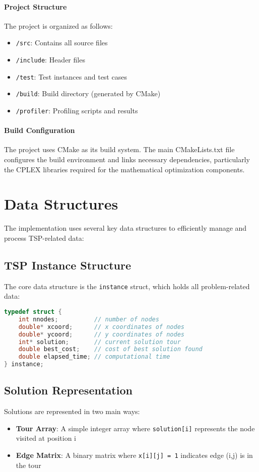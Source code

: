 \documentclass{article}
\begin{document}
\paragraph{Project Structure}
The project is organized as follows:
\begin{itemize}
	\item \texttt{/src}: Contains all source files
	\item \texttt{/include}: Header files
	\item \texttt{/test}: Test instances and test cases
	\item \texttt{/build}: Build directory (generated by CMake)
	\item \texttt{/profiler}: Profiling scripts and results
\end{itemize}

\paragraph{Build Configuration}
The project uses CMake as its build system. The main CMakeLists.txt file configures the build environment and links necessary dependencies, 
particularly the CPLEX libraries required for the mathematical optimization components.

\section{Data Structures}
The implementation uses several key data structures to efficiently manage and process TSP-related data:

\subsection{TSP Instance Structure}
The core data structure is the \texttt{instance} struct, which holds all problem-related data:
\begin{lstlisting}[language=C]
typedef struct {
	int nnodes;          // number of nodes
	double* xcoord;      // x coordinates of nodes
	double* ycoord;      // y coordinates of nodes
	int* solution;       // current solution tour
	double best_cost;    // cost of best solution found
	double elapsed_time; // computational time
} instance;
\end{lstlisting}

\subsection{Solution Representation}
Solutions are represented in two main ways:
\begin{itemize}
	\item \textbf{Tour Array}: A simple integer array where \texttt{solution[i]} represents the node visited at position i
	\item \textbf{Edge Matrix}: A binary matrix where \texttt{x[i][j] = 1} indicates edge (i,j) is in the tour
\end{itemize}
\end{document}
